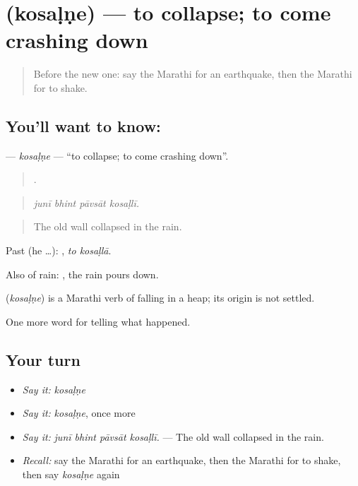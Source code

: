 \section[\texorpdfstring{\mr{कोसळणे} (kosaḷṇe)}{कोसळणे (kosaḷṇe)}]{ (kosaḷṇe) — to collapse; to come crashing down}

\label{lesson:MR-C293-kosalne}



\begin{quote}
Before the new one: say the Marathi for an earthquake, then the Marathi for to shake.
\end{quote}

\subsection*{You'll want to know: }
\textbf{} — \emph{kosaḷṇe} — \textquotedblleft{}to collapse; to come crashing down\textquotedblright{}.

\begin{quote}
   .
\end{quote}

\begin{quote}
\emph{junī bhint pāvsāt kosaḷlī.}
\end{quote}

\begin{quote}
The old wall collapsed in the rain.
\end{quote}

Past (he …):  , \emph{to kosaḷlā}.

Also of rain:  , the rain pours down.

\begin{cousinweb}
\textbf{} (\emph{kosaḷṇe}) is a Marathi verb of falling in a heap; its origin is not settled.
\end{cousinweb}

\begin{grammarlens}[title={What you've built}]
One more word for telling what happened.
\end{grammarlens}

\subsection*{Your turn}
\begin{itemize}
\raggedright
  \item \emph{Say it:} \emph{kosaḷṇe}
  \item \emph{Say it:} \emph{kosaḷṇe}, once more
  \item \emph{Say it:} \emph{junī bhint pāvsāt kosaḷlī.} — The old wall collapsed in the rain.
  \item \emph{Recall:} say the Marathi for an earthquake, then the Marathi for to shake, then say \emph{kosaḷṇe} again
\end{itemize}

